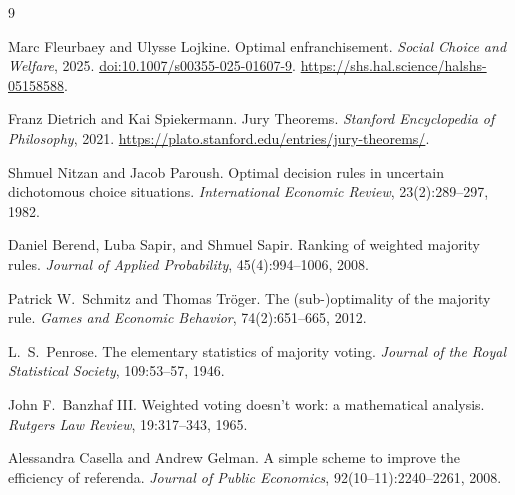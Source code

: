 \documentclass{article}
\theoremstyle{plain}
\theoremstyle{definition}
\newcommand{\doi}[1]{\href{https://doi.org/#1}{doi:#1}}
\begin{document}
\begin{thebibliography}{9}

Marc Fleurbaey and Ulysse Lojkine.
\newblock Optimal enfranchisement.
\newblock \emph{Social Choice and Welfare}, 2025.
\newblock \doi{10.1007/s00355-025-01607-9}.
\newblock \url{https://shs.hal.science/halshs-05158588}.

Franz Dietrich and Kai Spiekermann.
\newblock Jury Theorems.
\newblock \emph{Stanford Encyclopedia of Philosophy}, 2021.
\newblock \url{https://plato.stanford.edu/entries/jury-theorems/}.

Shmuel Nitzan and Jacob Paroush.
\newblock Optimal decision rules in uncertain dichotomous choice situations.
\newblock \emph{International Economic Review}, 23(2):289--297, 1982.

Daniel Berend, Luba Sapir, and Shmuel Sapir.
\newblock Ranking of weighted majority rules.
\newblock \emph{Journal of Applied Probability}, 45(4):994--1006, 2008.

Patrick W.\ Schmitz and Thomas Tr\"oger.
\newblock The (sub-)optimality of the majority rule.
\newblock \emph{Games and Economic Behavior}, 74(2):651--665, 2012.

L.\ S.\ Penrose.
\newblock The elementary statistics of majority voting.
\newblock \emph{Journal of the Royal Statistical Society}, 109:53--57, 1946.

John F.\ Banzhaf III.
\newblock Weighted voting doesn't work: a mathematical analysis.
\newblock \emph{Rutgers Law Review}, 19:317--343, 1965.

Alessandra Casella and Andrew Gelman.
\newblock A simple scheme to improve the efficiency of referenda.
\newblock \emph{Journal of Public Economics}, 92(10--11):2240--2261, 2008.

\end{thebibliography}
\end{document}
